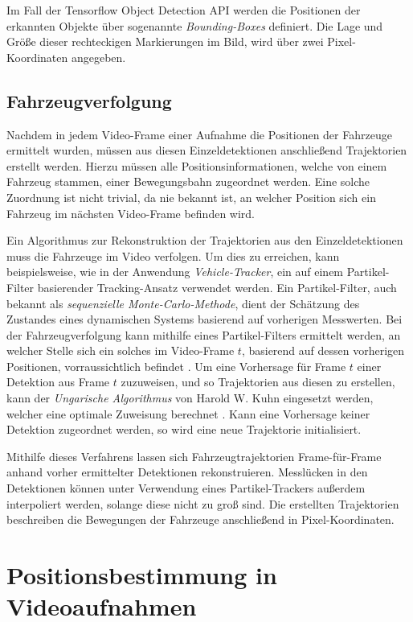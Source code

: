 Im Fall der Tensorflow Object Detection API werden die Positionen der erkannten Objekte über sogenannte
\textit{Bounding-Boxes} definiert. Die Lage und Größe dieser rechteckigen Markierungen im Bild, wird über
zwei Pixel-Koordinaten angegeben. \cite[]{Huang2018}

\subsection{Fahrzeugverfolgung}

Nachdem in jedem Video-Frame einer Aufnahme die Positionen der Fahrzeuge ermittelt wurden,
müssen aus diesen Einzeldetektionen anschließend Trajektorien erstellt werden.
Hierzu müssen alle Positionsinformationen, welche von einem Fahrzeug stammen, einer Bewegungsbahn zugeordnet werden.
Eine solche Zuordnung ist nicht trivial, da nie bekannt ist, an welcher Position sich ein Fahrzeug im
nächsten Video-Frame befinden wird.

Ein Algorithmus zur Rekonstruktion der Trajektorien aus den Einzeldetektionen muss die Fahrzeuge im Video
verfolgen. Um dies zu erreichen, kann beispielsweise, wie in der Anwendung \textit{Vehicle-Tracker},
ein auf einem Partikel-Filter basierender Tracking-Ansatz verwendet werden.
Ein Partikel-Filter, auch bekannt als \textit{sequenzielle Monte-Carlo-Methode}, dient der Schätzung
des Zustandes eines dynamischen Systems basierend auf vorherigen Messwerten.
Bei der Fahrzeugverfolgung kann mithilfe eines Partikel-Filters ermittelt werden, an welcher Stelle sich
ein solches im Video-Frame $t$, basierend auf dessen vorherigen Positionen, vorraussichtlich befindet \cite[]{Apeltauer2015}.
Um eine Vorhersage für Frame $t$ einer Detektion aus Frame $t$ zuzuweisen, und so Trajektorien aus diesen zu erstellen,
kann der \textit{Ungarische Algorithmus} von Harold W. Kuhn eingesetzt werden, welcher eine optimale
Zuweisung berechnet \cite[]{Szottka2011}. Kann eine Vorhersage keiner Detektion zugeordnet werden,
so wird eine neue Trajektorie initialisiert.

Mithilfe dieses Verfahrens lassen sich Fahrzeugtrajektorien Frame-für-Frame anhand vorher ermittelter
Detektionen rekonstruieren. Messlücken in den Detektionen können unter Verwendung eines Partikel-Trackers
außerdem interpoliert werden, solange diese nicht zu groß sind.
Die erstellten Trajektorien beschreiben die Bewegungen der Fahrzeuge anschließend in Pixel-Koordinaten.

\section{Positionsbestimmung in Videoaufnahmen}
\label{sec:grund_mapMatching}


